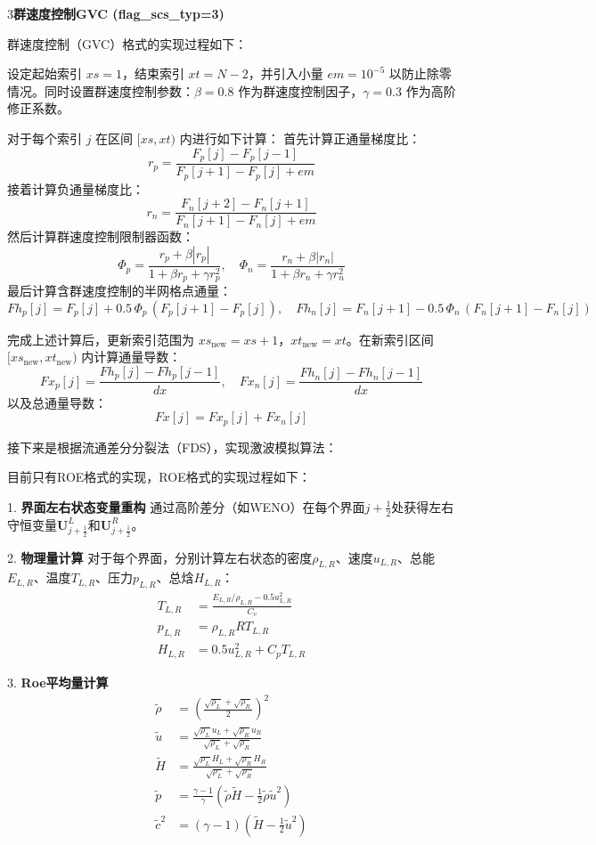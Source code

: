\documentclass[12pt,a4paper]{article}
\begin{document}
3\quad \textbf{群速度控制GVC (flag\_scs\_typ=3)}

群速度控制（GVC）格式的实现过程如下：

设定起始索引 $xs=1$，结束索引 $xt=N-2$，并引入小量 $em=10^{-5}$ 以防止除零情况。同时设置群速度控制参数：$\beta=0.8$ 作为群速度控制因子，$\gamma=0.3$ 作为高阶修正系数。

对于每个索引 $j$ 在区间 $[xs, xt)$ 内进行如下计算：
首先计算正通量梯度比：
$$
r_p = \dfrac{F_p[j] - F_p[j-1]}{F_p[j+1] - F_p[j] + em}
$$
接着计算负通量梯度比：
$$
r_n = \dfrac{F_n[j+2] - F_n[j+1]}{F_n[j+1] - F_n[j] + em}
$$
然后计算群速度控制限制器函数：
$$
\Phi_p = \frac{r_p + \beta |r_p|}{1 + \beta r_p + \gamma r_p^2}, \quad
\Phi_n = \frac{r_n + \beta |r_n|}{1 + \beta r_n + \gamma r_n^2}
$$
最后计算含群速度控制的半网格点通量：
$$
Fh_p[j] = F_p[j] + 0.5\,\Phi_p\,(F_p[j+1] - F_p[j]), \quad
Fh_n[j] = F_n[j+1] - 0.5\,\Phi_n\,(F_n[j+1] - F_n[j])
$$

完成上述计算后，更新索引范围为 $xs_{\text{new}} = xs+1$，$xt_{\text{new}} = xt$。在新索引区间 $[xs_{\text{new}}, xt_{\text{new}})$ 内计算通量导数：
$$
Fx_p[j] = \frac{Fh_p[j] - Fh_p[j-1]}{dx}, \quad
Fx_n[j] = \frac{Fh_n[j] - Fh_n[j-1]}{dx}
$$
以及总通量导数：
$$
Fx[j] = Fx_p[j] + Fx_n[j]
$$

接下来是根据流通差分分裂法（FDS），实现激波模拟算法：

目前只有ROE格式的实现，ROE格式的实现过程如下：

1. \textbf{界面左右状态变量重构}  
    通过高阶差分（如WENO）在每个界面$j+\frac{1}{2}$处获得左右守恒变量$\mathbf{U}_{j+\frac{1}{2}}^L$和$\mathbf{U}_{j+\frac{1}{2}}^R$。

2. \textbf{物理量计算}  
    对于每个界面，分别计算左右状态的密度$\rho_{L,R}$、速度$u_{L,R}$、总能$E_{L,R}$、温度$T_{L,R}$、压力$p_{L,R}$、总焓$H_{L,R}$：
    \begin{align*}
    T_{L,R} &= \frac{E_{L,R}/\rho_{L,R} - 0.5 u_{L,R}^2}{C_v} \\
    p_{L,R} &= \rho_{L,R} R T_{L,R} \\
    H_{L,R} &= 0.5 u_{L,R}^2 + C_p T_{L,R}
    \end{align*}

3. \textbf{Roe平均量计算}  
    \begin{align*}
    \tilde{\rho} &= \left( \frac{\sqrt{\rho_L} + \sqrt{\rho_R}}{2} \right)^2 \\
    \tilde{u} &= \frac{\sqrt{\rho_L} u_L + \sqrt{\rho_R} u_R}{\sqrt{\rho_L} + \sqrt{\rho_R}} \\
    \tilde{H} &= \frac{\sqrt{\rho_L} H_L + \sqrt{\rho_R} H_R}{\sqrt{\rho_L} + \sqrt{\rho_R}} \\
    \tilde{p} &= \frac{\gamma-1}{\gamma} \left( \tilde{\rho} \tilde{H} - \frac{1}{2} \tilde{\rho} \tilde{u}^2 \right) \\
    \tilde{c}^2 &= (\gamma-1)\left( \tilde{H} - \frac{1}{2} \tilde{u}^2 \right)
    \end{align*}
\end{document}
